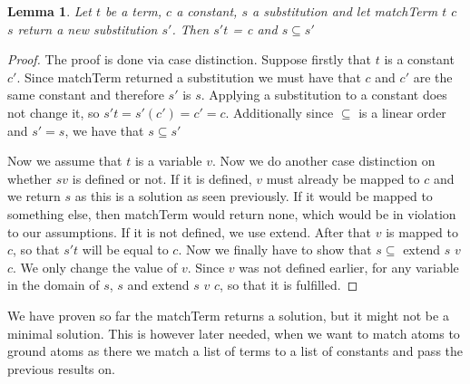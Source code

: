 \documentclass{article}
\newtheorem{lemma}{Lemma}
\begin{document}
        \begin{lemma}
        Let $t$ be a term, $c$ a constant, $s$ a substitution and let matchTerm $t$ $c$ $s$ return a new substitution $s'$. Then $s' t$ = c and $s \subseteq s'$
        \end{lemma}
        \begin{proof}
        The proof is done via case distinction. Suppose firstly that $t$ is a constant $c'$. Since matchTerm returned a substitution we must have that $c$ and $c'$ are the same constant and therefore $s'$ is $s$. Applying a substitution to a constant does not change it, so $s' t = s' (c') = c' = c$. Additionally since $\subseteq$ is a linear order and $s' = s$, we have that $s \subseteq s'$

        Now we assume that $t$ is a variable $v$. Now we do another case distinction on whether $s v$ is defined or not. If it is defined, $v$ must already be mapped to $c$ and we return $s$ as this is a solution as seen previously. If it would be mapped to something else, then matchTerm would return none, which would be in violation to our assumptions.
        If it is not defined, we use extend. After that $v$ is mapped to $c$, so that $s' t$ will be equal to $c$. Now we finally have to show that $s \subseteq$ extend $s$ $v$ $c$. We only change the value of $v$. Since $v$ was not defined earlier, for any variable in the domain of $s$, $s$ and extend $s$ $v$ $c$, so that it is fulfilled.
        \end{proof}

        We have proven so far the matchTerm returns a solution, but it might not be a minimal solution. This is however later needed, when we want to match atoms to ground atoms as there we match a list of terms to a list of constants and pass the previous results on.
\end{document}
